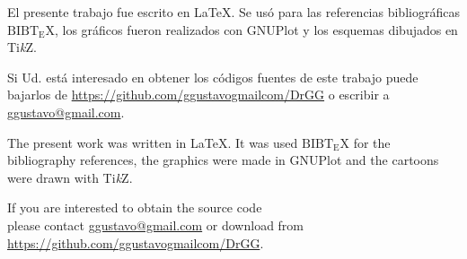   \thispagestyle{empty}	
  \begin{flushright}
    \vspace*{\fill}
    {\cirth \color{black}{gg}}
    \vspace*{0.1mm}
    \end{flushright}
\cleardoublepage

\vspace*{\fill}
 \begin{center}
	\begin{minipage}{0.70\textwidth}
	
    \begin{center}
	\scriptsize{
		El presente trabajo fue escrito en \LaTeX. Se usó para las referencias bibliográficas $\mathrm{B{\scriptstyle{IB}} \! T\!_{\displaystyle E} \! X}$, los gráficos fueron realizados con GNUPlot y los esquemas dibujados en Ti\textit{k}Z.
		
		\vspace*{1mm}
		
		Si Ud. está interesado en obtener los códigos fuentes de este trabajo puede bajarlos de 
		\url{https://github.com/ggustavogmailcom/DrGG} o escribir a \href{mailto:ggustavo@gmail.com}{ggustavo@gmail.com}.
		
		\vspace*{1cm}
		
		The present work was written in \LaTeX. It was used $\mathrm{B{\scriptstyle{IB}} \! T\!_{\displaystyle E} \! X}$ for the bibliography references, the graphics were made in GNUPlot and the cartoons were drawn with Ti\textit{k}Z.
			
		\vspace*{1mm}
		
		If you are interested to obtain the source code \\ please contact \href{mailto:ggustavo@gmail.com}{ggustavo@gmail.com} or download from \url{https://github.com/ggustavogmailcom/DrGG}.
		}

	\end{center}

	\end{minipage}
 \end{center}